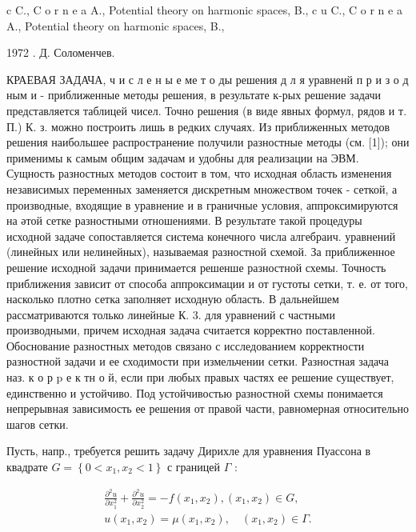 \documentclass[10pt]{article}
\begin{document}
c C., C o r n e a A., Potential theory on harmonic spaces, B., c u C., C o r n e a A., Potential theory on harmonic spaces, B.,

1972 . Д. Соломенчев.



КРАЕВАЯ ЗАДАЧА, ч и с л е н ы е ме т о ды решения д л я уравненй п р и з о д ным и - приближенные методы решения, в результате к-рых решение задачи представляется таблицей чисел. Точно решения (в виде явных формул, рядов и т. П.) К. з. можно построить лишь в редких случаях. Из приближенных методов решения наибольшее распространение получили разностные методы (см. [1]); они применимы к самым общим задачам и удобны для реализации на ЭВМ. Сущность разностных методов состоит в том, что исходная область изменения независимых переменных заменяется дискретным множеством точек - сеткой, а производные, входящие в уравнение и в граничные условия, аппроксимируются на әтой сетке разностными отношениями. В результате такой процедуры исходной задаче сопоставляется система конечного числа алгебраич. уравнений (линейных или нелинейных), называемая разностной схемой. За приближенное решение исходной задачи принимается решенше разностной схемы. Точность приближения зависит от способа аппроксимации и от густоты сетки, т. е. от того, насколько плотно сетка заполняет исходную область. В дальнейшем рассматриваются только линейные К. 3. для уравнений с частными производными, причем исходная задача считается корректно поставленной. Обоснование разностных методов связано с исследованием корректности разностной задачи и ее сходимости при измельчении сетки. Разностная задача наз. к о р p е к тн о й, если при любых правых частях ее решение существует, единственно и устойчиво. Под устойчивостью разностной схемы понимается непрерывная зависимость ее решения от правой части, равномерная относительно шагов сетки.



Пусть, напр., требуется решить задачу Дирихле для уравнения Пуассона в квадрате $G=\left\{0<x_{1}, x_{2}<1\right\}$ с границей $\Gamma$ :



\[

\begin{gathered}

\frac{\partial^{2} u}{\partial x_{1}^{2}}+\frac{\partial^{2} u}{\partial x_{2}^{2}}=-f\left(x_{1}, x_{2}\right),\left(x_{1}, x_{2}\right) \in G, \\

u\left(x_{1}, x_{2}\right)=\mu\left(x_{1}, x_{2}\right), \quad\left(x_{1}, x_{2}\right) \in \Gamma .

\end{gathered}

\]
\end{document}
